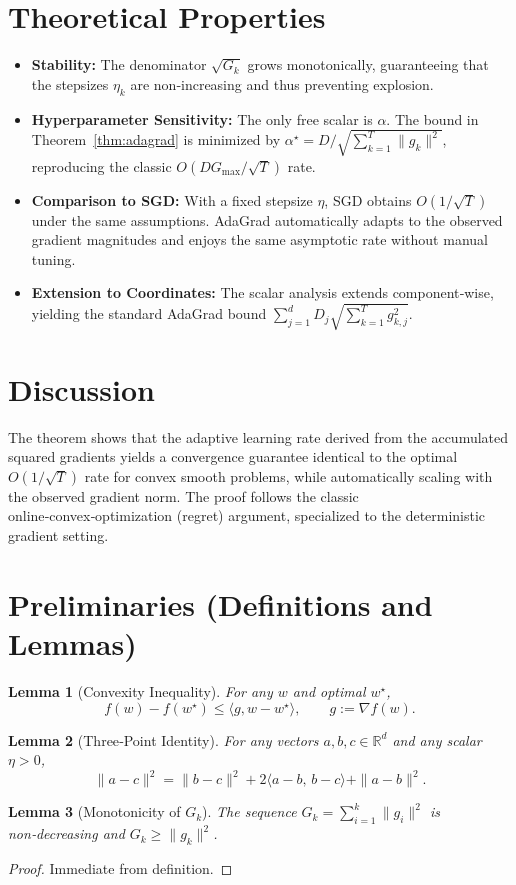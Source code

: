 \documentclass{article}
\newtheorem{lemma}{Lemma}
\begin{document}
\section*{Theoretical Properties}
\begin{itemize}[leftmargin=*]
\item \textbf{Stability:} The denominator $\sqrt{G_{k}}$ grows monotonically, guaranteeing that the stepsizes $\eta_{k}$ are non‑increasing and thus preventing explosion.
\item \textbf{Hyperparameter Sensitivity:} The only free scalar is $\alpha$. The bound in Theorem~\ref{thm:adagrad} is minimized by $\alpha^{\star}=D/\sqrt{\sum_{k=1}^{T}\|g_{k}\|^{2}}$, reproducing the classic $O(DG_{\max}/\sqrt{T})$ rate.
\item \textbf{Comparison to SGD:} With a fixed stepsize $\eta$, SGD obtains $O(1/\sqrt{T})$ under the same assumptions. AdaGrad automatically adapts to the observed gradient magnitudes and enjoys the same asymptotic rate without manual tuning.
\item \textbf{Extension to Coordinates:} The scalar analysis extends component‑wise, yielding the standard AdaGrad bound $\sum_{j=1}^{d} D_{j}\sqrt{\sum_{k=1}^{T}g_{k,j}^{2}}$.
\end{itemize}

\section*{Discussion}
The theorem shows that the adaptive learning rate derived from the accumulated squared gradients yields a convergence guarantee identical to the optimal $O(1/\sqrt{T})$ rate for convex smooth problems, while automatically scaling with the observed gradient norm. The proof follows the classic online‑convex‑optimization (regret) argument, specialized to the deterministic gradient setting.

\newpage
\section*{Preliminaries (Definitions and Lemmas)}
\begin{lemma}[Convexity Inequality]\label{lem:conv}
For any $w$ and optimal $w^{\star}$,
\[
f(w)-f(w^{\star})\le\langle g, w-w^{\star}\rangle,\qquad g:=\nabla f(w).
\]
\end{lemma}
\begin{lemma}[Three‑Point Identity]\label{lem:3pt}
For any vectors $a,b,c\in\mathbb{R}^{d}$ and any scalar $\eta>0$,
\[
\|a-c\|^{2}= \|b-c\|^{2}+2\langle a-b,\,b-c\rangle+\|a-b\|^{2}.
\]
\end{lemma}
\begin{lemma}[Monotonicity of $G_{k}$]\label{lem:mon}
The sequence $G_{k}=\sum_{i=1}^{k}\|g_{i}\|^{2}$ is non‑decreasing and $G_{k}\ge\|g_{k}\|^{2}$.
\end{lemma}
\begin{proof}
Immediate from definition. \qedhere
\end{proof}
\end{document}
